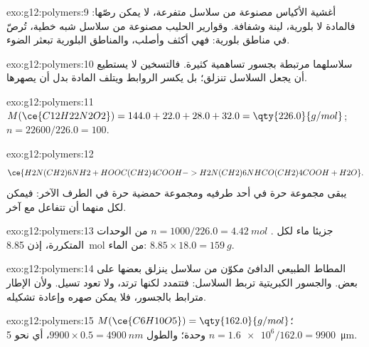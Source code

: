 \begin{solution}{exo:g12:polymers:9}
أغشية الأكياس مصنوعة من سلاسل متفرعة، لا يمكن رصّها: فالمادة
لا بلورية، لينة وشفافة. وقوارير الحليب مصنوعة من سلاسل شبه
خطية، تُرصّ في مناطق بلورية: فهي أكثف وأصلب،
والمناطق البلورية تبعثر الضوء.
\end{solution}

\begin{solution}{exo:g12:polymers:10}
سلاسلهما مرتبطة بجسور تساهمية كثيرة. فالتسخين لا يستطيع أن
يجعل السلاسل تنزلق؛ بل يكسر الروابط ويتلف المادة بدل
أن يصهرها.
\end{solution}

\begin{solution}{exo:g12:polymers:11}
$M(\ce{C12H22N2O2}) = 144.0 + 22.0 + 28.0 + 32.0 = \qty{226.0}{g/mol}$;
$n = 22600/226.0 = 100$.
\end{solution}

\begin{solution}{exo:g12:polymers:12}
\[
  \ce{H2N(CH2)6NH2 + HOOC(CH2)4COOH -> H2N(CH2)6NHCO(CH2)4COOH + H2O} .
\]
يبقى  مجموعة  حرة في أحد طرفيه ومجموعة حمضية حرة
في الطرف الآخر: فيمكن لكل منهما أن تتفاعل مع  آخر.
\end{solution}

\begin{solution}{exo:g12:polymers:13}
جزيئا ماء لكل . $n = 1000/226.0 =
\qty{4.42}{mol}$ من الوحدات المتكررة، إذن \qty{8.85}{mol} من الماء:
$8.85 \times 18.0 = \qty{159}{g}$.
\end{solution}

\begin{solution}{exo:g12:polymers:14}
المطاط الطبيعي الدافئ مكوّن من سلاسل ينزلق بعضها على بعض.
والجسور الكبريتية تربط السلاسل: فتتمدد لكنها ترتد، ولا
تعود تسيل. ولأن الإطار مترابط بالجسور، فلا يمكن صهره وإعادة تشكيله.
\end{solution}

\begin{solution}{exo:g12:polymers:15}
$M(\ce{C6H10O5}) = \qty{162.0}{g/mol}$؛ $n = \num{1.6e6}/162.0 = 9900$
وحدة؛ والطول $9900 \times 0.5 = \qty{4900}{nm}$، أي نحو
\qty{5}{\micro m}.
\end{solution}

